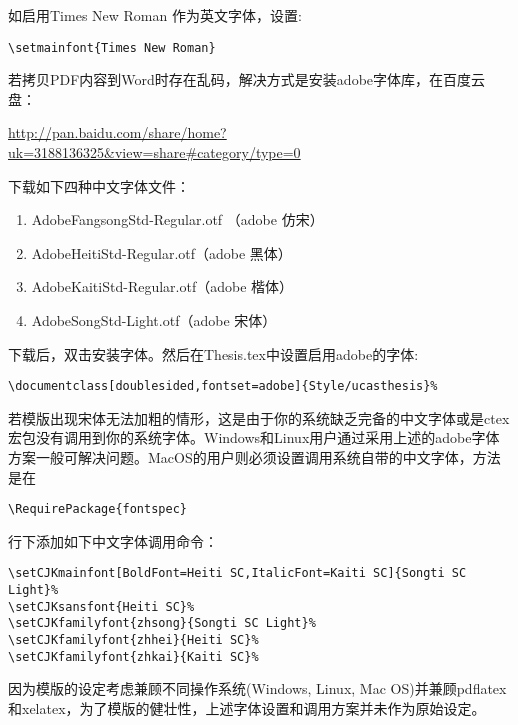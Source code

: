 \begin{enumerate}
\begin{enumerate}
                 如启用Times New Roman 作为英文字体，设置:

                 \verb|\setmainfont{Times New Roman}|

                若拷贝PDF内容到Word时存在乱码，解决方式是安装adobe字体库，在百度云盘：

                {
                    \scriptsize
                    \url{http://pan.baidu.com/share/home?uk=3188136325&view=share#category/type=0}
                }
                 
                 下载如下四种中文字体文件：
                 \begin{enumerate}
                     \footnotesize
                     \item AdobeFangsongStd-Regular.otf （adobe 仿宋）
                     \item AdobeHeitiStd-Regular.otf（adobe 黑体）
                     \item AdobeKaitiStd-Regular.otf（adobe 楷体）
                     \item AdobeSongStd-Light.otf（adobe 宋体）
                 \end{enumerate}
                下载后，双击安装字体。然后在Thesis.tex中设置启用adobe的字体:

                \verb+\documentclass[doublesided,fontset=adobe]{Style/ucasthesis}%+

              若模版出现宋体无法加粗的情形，这是由于你的系统缺乏完备的中文字体或是ctex宏包没有调用到你的系统字体。Windows和Linux用户通过采用上述的adobe字体方案一般可解决问题。MacOS的用户则必须设置调用系统自带的中文字体，方法是在
                
                \verb|\RequirePackage{fontspec}|
                
                行下添加如下中文字体调用命令：
                {
                    \footnotesize
\begin{verbatim}
\setCJKmainfont[BoldFont=Heiti SC,ItalicFont=Kaiti SC]{Songti SC Light}%
\setCJKsansfont{Heiti SC}%
\setCJKfamilyfont{zhsong}{Songti SC Light}%
\setCJKfamilyfont{zhhei}{Heiti SC}%
\setCJKfamilyfont{zhkai}{Kaiti SC}%
\end{verbatim}
                }
                
                因为模版的设定考虑兼顾不同操作系统(Windows, Linux, Mac OS)并兼顾pdflatex和xelatex，为了模版的健壮性，上述字体设置和调用方案并未作为原始设定。
        \end{enumerate}


\end{enumerate}
